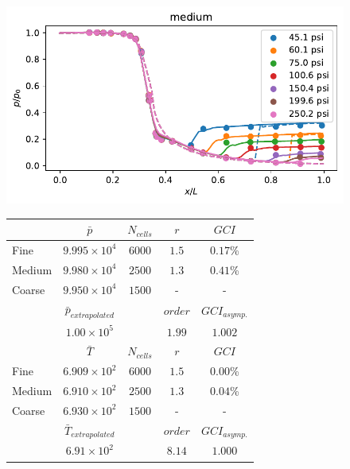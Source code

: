 \begin{figure}[h]
  \begin{minipage}{0.45\columnwidth}
  \centering
  \includegraphics[width=\hsize]{Figuras/validation/validation_medium.pdf}
  \caption{}
  \end{minipage}
  \begin{minipage}{0.55\columnwidth}
  \centering
    \begin{tabular}{lcccc}
    \toprule
    & $ \bar{p} $ & $ N_{cells} $ & $ r $ & $ GCI $ \\ \midrule
    Fine & $9.995\times10^4$ & $6000$ & $1.5$ & $0.17$\% \\ 
    Medium & $9.980\times10^4$ & $2500$  & $1.3$ & $0.41$\% \\ 
    Coarse & $9.950\times10^4$ & $1500$  & -   & -  \\ 
    & $ \bar{p}_{extrapolated} $ & & $ order $ &  $ GCI_{asymp.} $ \\ \cline{2-5}
    &  $1.00\times10^5$  &  & $1.99$  &  $1.002$  \\ [0.5ex] \midrule     
    & $ \bar{T} $ & $ N_{cells} $ & $ r $ & $ GCI $\\ \midrule 
    Fine & $6.909\times10^2$ & $6000$ & $1.5$ & $0.00$\% \\ 
    Medium & $6.910\times10^2$ & $2500$  & $1.3$ & $0.04$\%\\ 
    Coarse & $6.930\times10^2$ & $1500$  & -   & -   \\ 
    & $ \bar{T}_{extrapolated} $ & & $ order $ &  $ GCI_{asymp.} $ \\ \cline{2-5}
    & $6.91\times10^2$  &  &  $8.14$ &  $1.000$   \\
    \bottomrule
    \end{tabular}
  \end{minipage}
\end{figure}

